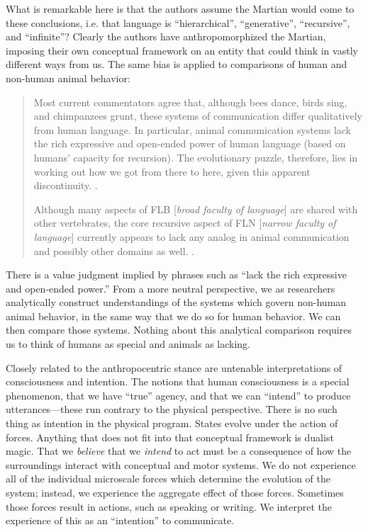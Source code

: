  What is remarkable here is that the authors assume the Martian would come to these conclusions, i.e. that language is “hierarchical”, “generative”, “recursive”, and “infinite”? Clearly the authors have anthropomorphized the Martian, imposing their own conceptual framework on an entity that could think in vastly different ways from us. The same bias is applied to comparisons of human and non-human animal behavior:

\begin{quote}
Most current commentators agree that, although bees dance, birds sing, and chimpanzees grunt, these systems of communication differ qualitatively from human language. In particular, animal communication systems lack the rich expressive and open-ended power of human language (based on humans' capacity for recursion). The evolutionary puzzle, therefore, lies in working out how we got from there to here, given this apparent discontinuity. \citep{HauserEtAl2002}.

Although many aspects of FLB [\textit{broad faculty of language}] are shared with other vertebrates, the core recursive aspect of FLN [\textit{narrow faculty of language}] currently appears to lack any analog in animal communication and possibly other domains as well. \citep{HauserEtAl2002}.
\end{quote}

  There is a value judgment implied by phrases such as “lack the rich expressive and open-ended power.” From a more neutral perspective, we as researchers analytically construct understandings of the systems which govern non-human animal behavior, in the same way that we do so for human behavior. We can then compare those systems. Nothing about this analytical comparison requires us to think of humans as special and animals as lacking.

  Closely related to the anthropocentric stance are untenable interpretations of consciousness and intention. The notions that human consciousness is a special phenomenon, that we have “true” agency, and that we can “intend” to produce utterances—these run contrary to the physical perspective. There is no such thing as intention in the physical program. States evolve under the action of forces. Anything that does not fit into that conceptual framework is dualist magic. That we \textit{believe} that we \textit{intend} to act must be a consequence of how the surroundings interact with conceptual and motor systems. We do not experience all of the individual microscale forces which determine the evolution of the system; instead, we experience the aggregate effect of those forces.  Sometimes those forces result in actions, such as speaking or writing. We interpret the experience of this as an “intention” to communicate.

